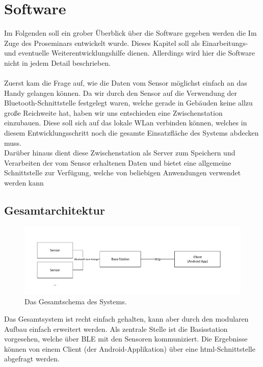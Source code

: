 \section{Software}
Im Folgenden soll ein grober Überblick über die Software gegeben werden die Im Zuge des Proseminars entwickelt wurde. Dieses Kapitel soll als Einarbeitungs- und eventuelle Weiterentwicklungshilfe dienen. Allerdings wird hier die Software nicht in jedem Detail beschrieben.
\\
\\
Zuerst kam die Frage auf, wie die Daten vom Sensor möglichst einfach an das Handy gelangen können. Da wir durch den Sensor auf die Verwendung der Bluetooth-Schnittstelle festgelegt waren, welche gerade in Gebäuden keine allzu große Reichweite hat, haben wir uns entschieden eine Zwischenstation einzubauen. Diese soll sich auf das lokale WLan verbinden können, welches in diesem Entwicklungsschritt noch die gesamte Einsatzfläche des Systems abdecken muss. \\
Darüber hinaus dient diese Zwischenstation als Server zum Speichern und Verarbeiten der vom Sensor erhaltenen Daten und bietet eine allgemeine Schnittstelle zur Verfügung, welche von beliebigen Anwendungen verwendet werden kann
\subsection{Gesamtarchitektur}
\begin{figure}[htb] 
	\centerline{\includegraphics[scale=.5]{Architektur/dryR_complete.pdf}}
	\caption{Das Gesamtschema des Systems.}
\end{figure}

Das Gesamtsystem ist recht einfach gehalten, kann aber durch den modularen Aufbau einfach erweitert werden. Als zentrale Stelle ist die Basisstation vorgesehen, welche über BLE mit den Sensoren kommuniziert. Die Ergebnisse können von einem Client (der Android-Applikation) über eine html-Schnittstelle abgefragt werden.
